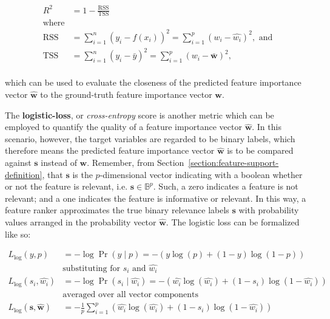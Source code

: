\documentclass{article}
\begin{document}
\begin{equation}
\begin{aligned}
R^{2}&=1-\frac{\mathrm{RSS}}{\mathrm{TSS}} \\
\text{where}&\\
\mathrm{RSS} &= \sum_{i=1}^{n}\left(y_{i}-f\left(x_{i}\right)\right)^{2} =\sum_{i=1}^{p}\left(w_i - \hat{w_i} \right)^{2}, \text{ and}\\
\mathrm{TSS} &= \sum_{i=1}^{n}\left(y_{i}-\bar{y}\right)^{2} =\sum_{i=1}^{p}\left( w_i - \bar{\boldsymbol{w}} \right)^{2}, \\
\end{aligned}
\end{equation}

which can be used to evaluate the closeness of the predicted feature importance vector $\hat{\boldsymbol{w}}$ to the ground-truth feature importance vector $\boldsymbol{w}$.

The \textbf{logistic-loss}, or \textit{cross-entropy} score is another metric which can be employed to quantify the quality of a feature importance vector $\hat{\boldsymbol{w}}$. In this scenario, however, the target variables are regarded to be binary labels, which therefore means the predicted feature importance vector $\hat{\boldsymbol{w}}$ is to be compared against $\boldsymbol{s}$ instead of $\boldsymbol{w}$. Remember, from Section~\ref{section:feature-support-definition}, that $\boldsymbol{s}$ is the $p$-dimensional vector indicating with a boolean whether or not the feature is relevant, i.e. $\boldsymbol{s} \in \mathbb{B}^p$. Such, a zero indicates a feature is not relevant; and a one indicates the feature is informative or relevant. In this way, a feature ranker approximates the true binary relevance labels $\boldsymbol{s}$ with probability values arranged in the probability vector $\hat{\boldsymbol{w}}$. The logistic loss can be formalized like so:

\begin{equation}
\begin{aligned}
L_{\log }(y, p) &= -\log \operatorname{Pr}(y \mid p)=-(y \log (p)+(1-y) \log (1-p)) \\
&\text{substituting for } s_i \text{ and } \hat{w_i}\\
L_{\log }(s_i, \hat{w_i}) &= -\log \operatorname{Pr}(s_i \mid \hat{w_i})= -(\hat{w_i} \log (\hat{w_i})+(1-s_i) \log (1-\hat{w_i})) \\
&\text{averaged over all vector components }\\
L_{\log }(\boldsymbol{s}, \hat{\boldsymbol{w}}) &= - \frac{1}{p} \sum_{i=1}^p (\hat{w_i} \log (\hat{w_i})+(1-s_i) \log (1-\hat{w_i})) \\
\end{aligned}
\end{equation}
\end{document}
